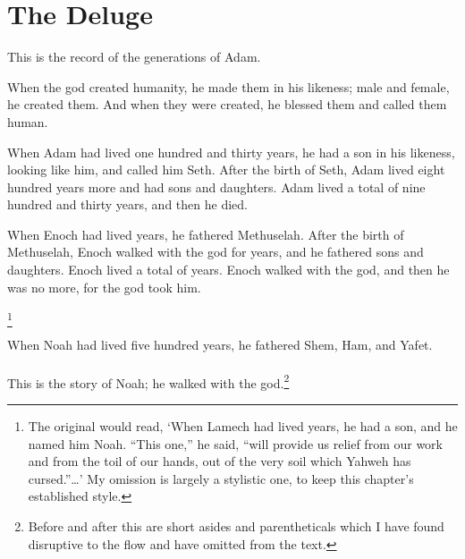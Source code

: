 \chapter{The Deluge}

This is the record of the generations of Adam.

When the god created humanity,
he made them in his likeness;
male and female, he created them.
And when they were created,
he blessed them 
and called them human.

When Adam had lived one hundred and thirty years,
he had a son in his likeness,
looking like him, 
and called him Seth.
After the birth of Seth,
Adam lived eight hundred years more
and had sons and daughters.
Adam lived a total of
nine hundred and thirty years,
and then he died.






When Enoch had lived  years,
he fathered Methuselah.
After the birth of Methuselah,
Enoch walked with the god for  years,
and he fathered sons and daughters.
Enoch lived
a total of  years. 
Enoch walked with the god, 
and then he was no more,
for the god took him.


\footnote{
    The original would read,
    `When Lamech had lived  years,
    he had a son,
    and he named him Noah.
    ``This one,'' he said, 
    ``will provide us relief from our work
    and from the toil of our hands,
    out of the very soil which Yahweh has cursed.''\dots'
    My omission is largely a stylistic one,
    to keep this chapter's established style.
}

When Noah had lived five hundred years,
he fathered Shem, Ham, and Yafet.

\subsubsection*{\secsep}

This is the story of Noah; he walked with the god.\footnote{
    Before and after this are short asides and parentheticals
    which I have found disruptive to the flow
    and have omitted from the text. 
} 

